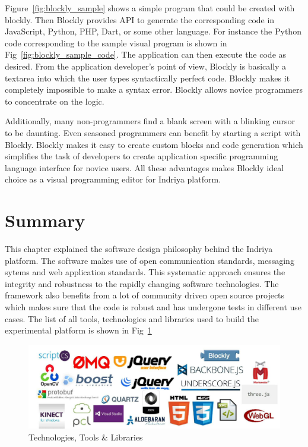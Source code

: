Figure~\ref{fig:blockly_sample} shows a simple program that could be created with blockly. Then Blockly provides API to generate the corresponding code in JavaScript, Python, PHP, Dart, or some other language. For instance the Python code corresponding to the sample visual program is shown in Fig~\ref{fig:blockly_sample_code}. The application can then execute the code as desired. From the application developer's point of view, Blockly is basically a textarea into which the user types syntactically perfect code. Blockly makes it completely impossible to make a syntax error. Blockly allows novice programmers to concentrate on the logic.

Additionally, many non-programmers find a blank screen with a blinking cursor to be daunting. Even seasoned programmers can benefit by starting a script with Blockly. Blockly makes it easy to create custom blocks and code generation which simplifies the task of developers to create application specific programming language interface for novice users. All these advantages makes Blockly ideal choice as a visual programming editor for Indriya platform.
\section{Summary}
This chapter explained the software design philosophy behind the Indriya platform. The software makes use of open communication standards, messaging sytems and web application standards. This systematic approach ensures the integrity and robustness to the rapidly changing software technologies. The framework also benefits from a lot of community driven open source projects which makes sure that the code is robust and has undergone tests in different use cases. The list of all tools, technologies and libraries used to build the experimental platform is shown in Fig~\ref{fig:libraries_used}
\begin{figure}
\centering
\includegraphics[width=\textwidth]{assets/libs.jpg}
\caption[Technologies, Tools \& Libraries]{Technologies, Tools \& Libraries}
\label{fig:libraries_used}
\end{figure}
